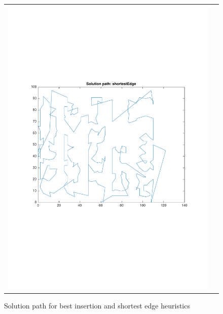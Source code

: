 \documentclass[a4paper, 11pt]{scrartcl}
\begin{document}
\begin{figure}[!ht]
\begin{tabular}{cc}
    \includegraphics[scale=0.4, trim={3cm 6cm 1cm 6cm}]{../figures/solutionPath_shortestEdge.pdf}                                                                        
  \end{tabular}
  \caption{Solution path for best insertion and shortest edge heuristics}
  \label{fig:solpath-bestinsertion}
\end{figure}
\end{document}
